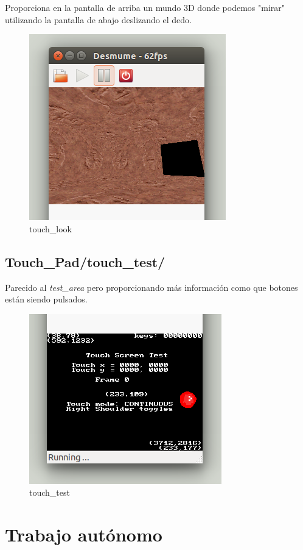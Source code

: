\documentclass[12pt,english]{article}
\begin{document}
    Proporciona en la pantalla de arriba un mundo 3D donde podemos "mirar" utilizando la pantalla de abajo deslizando el dedo.

    \begin{figure}[H] 
    \centering
    \includegraphics[scale=0.5]{images/touch_look}
    \caption{touch\_look}
    \end{figure}

    \subsection{Touch\_Pad/touch\_test/}

    Parecido al \emph{test\_area} pero proporcionando más información como que botones están siendo pulsados.

    \begin{figure}[H] 
    \centering
    \includegraphics[scale=0.5]{images/touch_test}
    \caption{touch\_test}
    \end{figure}

    \newpage

    \section{Trabajo autónomo}
\end{document}
